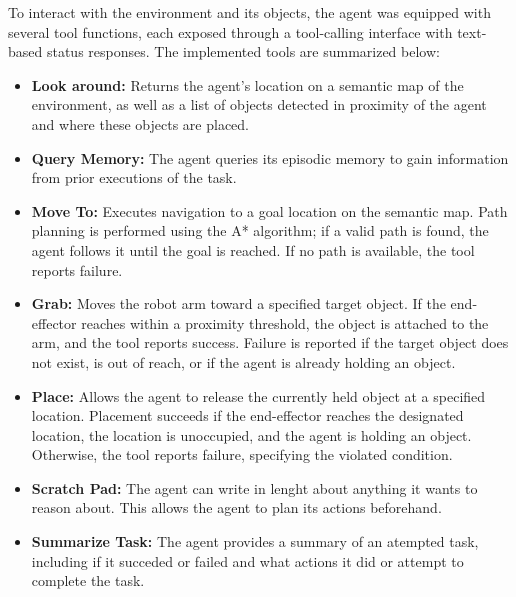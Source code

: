 \documentclass[../report.tex]{subfiles}
\begin{document}
To interact with the environment and its objects, the agent was equipped with several tool functions, each exposed through a tool-calling interface with text-based status responses. The implemented tools are summarized below:
\begin{itemize}
	\item \textbf{Look around:} Returns the agent's location on a semantic map of the environment, as well as a list of objects detected in proximity of the agent and where these objects are placed.
	\item \textbf{Query Memory:} The agent queries its episodic memory to gain information from prior executions of the task.
	\item \textbf{Move To:} Executes navigation to a goal location on the semantic map. Path planning is performed using the A* algorithm; if a valid path is found, the agent follows it until the goal is reached. If no path is available, the tool reports failure.
	\item \textbf{Grab:} Moves the robot arm toward a specified target object. If the end-effector reaches within a proximity threshold, the object is attached to the arm, and the tool reports success. Failure is reported if the target object does not exist, is out of reach, or if the agent is already holding an object.
	\item \textbf{Place:} Allows the agent to release the currently held object at a specified location. Placement succeeds if the end-effector reaches the designated location, the location is unoccupied, and the agent is holding an object. Otherwise, the tool reports failure, specifying the violated condition.
	\item \textbf{Scratch Pad:} The agent can write in lenght about anything it wants to reason about. This allows the agent to plan its actions beforehand.
	\item \textbf{Summarize Task:} The agent provides a summary of an atempted task, including if it succeded or failed and what actions it did or attempt to complete the task.
\end{itemize}
\end{document}
